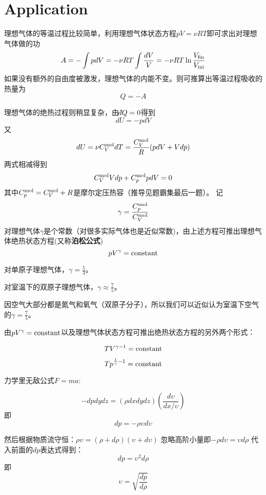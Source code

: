 \documentclass[CJK]{beamer}
\begin{document}
\section{Application}

\begin{frame}
\bch
理想气体的等温过程比较简单，利用理想气体状态方程$pV = \nu RT$即可求出对理想气体做的功
$$ A = -\int p dV = -\nu R T \int \frac{dV}{V} =- \nu R T\ln\frac{V_{\rm fin}}{V_{\rm ini}}$$
如果没有额外的自由度被激发，理想气体的内能不变。则可推算出等温过程吸收的热量为
$$ Q = - A $$
\ech
\end{frame}


\begin{frame}
\bch
{\small
理想气体的绝热过程则稍显复杂，由$\dbar Q=0$得到
$$ dU = -p dV$$
又$$ dU = \nu C_V^{\rm mol} dT = \frac{C_V^{\rm mol}}{R}(p dV + V dp)$$
两式相减得到
$$ C_V^{\rm mol} Vdp + C_p^{\rm mol} p dV = 0$$
其中$C_p^{\rm mol} = C_V^{\rm mol} + R$是摩尔定压热容（推导见题霸集最后一题）。
记$$\gamma = \frac{C_p^{\rm mol}}{C_V^{\rm mol}}$$
对理想气体$\gamma$是个常数（对很多实际气体也是近似常数)，由上述方程可推出{\blue 理想气体绝热状态方程}(又称{\bf 泊松公式})
{\blue 
$$p V^\gamma = \mathrm{constant}$$}
}
\ech
\end{frame}


\begin{frame}
\bch
{\small
对单原子理想气体，$\gamma = \frac{5}{3}$。

\skipline

对室温下的双原子理想气体，$\gamma \approx \frac{7}{5}$。

\skipline

因空气大部分都是氮气和氧气（双原子分子），所以我们可以近似认为室温下空气的$\gamma = \frac{7}{5}$。
}

由$pV^\gamma = \mathrm{constant} $以及理想气体状态方程可推出绝热状态方程的另外两个形式：

$$ TV^{\gamma-1} = \mathrm{constant}$$

$$T p^{\frac{1}{\gamma}-1} = \mathrm{constant} $$
\ech
\end{frame}

\begin{frame}
\bch
{}

{\scriptsize
力学里无敌公式$F = ma$:

$$ -dp dy dz = (\rho dx dy dz) \left(\frac{d\upsilon}{dx/\upsilon}\right) $$
即
$$ dp = - \rho \upsilon d\upsilon $$

然后根据物质流守恒：$ \rho \upsilon = (\rho + d\rho)(\upsilon+d\upsilon)$
忽略高阶小量即$ -\rho d\upsilon = \upsilon d\rho$
代入前面的$dp$表达式得到：
$$ dp = \upsilon ^2 d\rho$$
即
$$\upsilon = \sqrt{\frac{dp}{d\rho}}$$
}
\ech
\end{frame}
\end{document}
